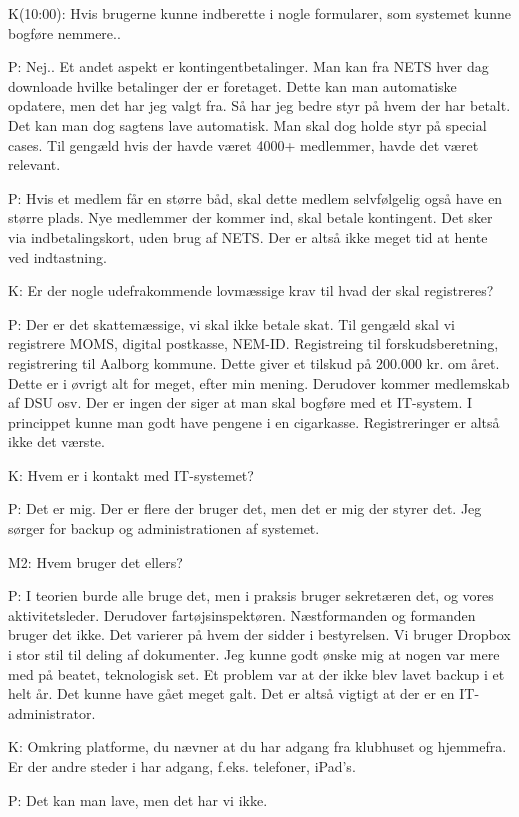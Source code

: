 K(10:00): Hvis brugerne kunne indberette i nogle formularer, som systemet kunne bogføre nemmere..

P: Nej.. Et andet aspekt er kontingentbetalinger. Man kan fra NETS hver dag downloade hvilke betalinger der er foretaget. Dette kan man automatiske opdatere, men det har jeg valgt fra. Så har jeg bedre styr på hvem der har betalt. Det kan man dog sagtens lave automatisk. Man skal dog holde styr på special cases. Til gengæld hvis der havde været 4000+ medlemmer, havde det været relevant.



P: Hvis et medlem får en større båd, skal dette medlem selvfølgelig også have en større plads. Nye medlemmer der kommer ind, skal betale kontingent. Det sker via indbetalingskort, uden brug af NETS. Der er altså ikke meget tid at hente ved indtastning.

K: Er der nogle udefrakommende lovmæssige krav til hvad der skal registreres?

P: Der er det skattemæssige, vi skal ikke betale skat. Til gengæld skal vi registrere MOMS, digital postkasse, NEM-ID. Registreing til forskudsberetning, registrering til Aalborg kommune. Dette giver et tilskud på 200.000 kr. om året. Dette er i øvrigt alt for meget, efter min mening. Derudover kommer medlemskab af DSU osv. Der er ingen der siger at man skal bogføre med et IT-system. I princippet kunne man godt have pengene i en cigarkasse. Registreringer er altså ikke det værste.

K: Hvem er i kontakt med IT-systemet?

P: Det er mig. Der er flere der bruger det, men det er mig der styrer det. Jeg sørger for backup og administrationen af systemet.

M2: Hvem bruger det ellers?

P: I teorien burde alle bruge det, men i praksis bruger sekretæren det, og vores aktivitetsleder. Derudover fartøjsinspektøren. Næstformanden og formanden bruger det ikke. Det varierer på hvem der sidder i bestyrelsen. Vi bruger Dropbox i stor stil til deling af dokumenter. Jeg kunne godt ønske mig at nogen var mere med på beatet, teknologisk set. Et problem var at der ikke blev lavet backup i et helt år. Det kunne have gået meget galt. Det er altså vigtigt at der er en IT-administrator.

K: Omkring platforme, du nævner at du har adgang fra klubhuset og hjemmefra. Er der andre steder i har adgang, f.eks. telefoner, iPad's.

P: Det kan man lave, men det har vi ikke.

